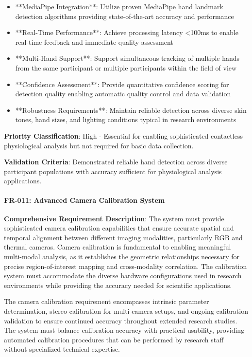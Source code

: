 \documentclass[12pt,a4paper]{article}
\begin{document}
\begin{itemize}
\item **MediaPipe Integration**: Utilize proven MediaPipe hand landmark detection algorithms providing state-of-the-art
  accuracy and performance
\item **Real-Time Performance**: Achieve processing latency <100ms to enable real-time feedback and immediate quality
  assessment
\item **Multi-Hand Support**: Support simultaneous tracking of multiple hands from the same participant or multiple
  participants within the field of view
\item **Confidence Assessment**: Provide quantitative confidence scoring for detection quality enabling automatic quality
  control and data validation
\item **Robustness Requirements**: Maintain reliable detection across diverse skin tones, hand sizes, and lighting
  conditions typical in research environments

\end{itemize}
\textbf{Priority Classification}: High - Essential for enabling sophisticated contactless physiological analysis but not
required for basic data collection.

\textbf{Validation Criteria}: Demonstrated reliable hand detection across diverse participant populations with accuracy
sufficient for physiological analysis applications.

\paragraph{FR-011: Advanced Camera Calibration System}

\textbf{Comprehensive Requirement Description}: The system must provide sophisticated camera calibration capabilities that
ensure accurate spatial and temporal alignment between different imaging modalities, particularly RGB and thermal
cameras. Camera calibration is fundamental to enabling meaningful multi-modal analysis, as it establishes the geometric
relationships necessary for precise region-of-interest mapping and cross-modality correlation. The calibration system
must accommodate the diverse hardware configurations used in research environments while providing the accuracy needed
for scientific applications.

The camera calibration requirement encompasses intrinsic parameter determination, stereo calibration for multi-camera
setups, and ongoing calibration validation to ensure continued accuracy throughout extended research studies. The system
must balance calibration accuracy with practical usability, providing automated calibration procedures that can be
performed by research staff without specialized technical expertise.
\end{document}
